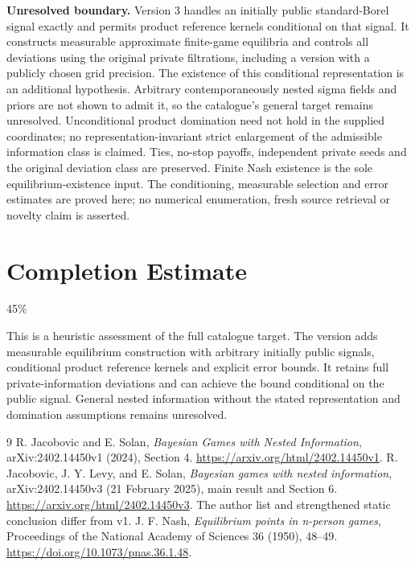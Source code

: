 \documentclass[11pt]{article}
\theoremstyle{remark}\newtheorem{remark}[theorem]{Remark}
\begin{document}
\textbf{Unresolved boundary.} Version 3 handles an initially public
standard-Borel signal exactly and permits product reference kernels
conditional on that signal. It constructs measurable approximate
finite-game equilibria and controls all deviations using the original
private filtrations, including a version with a publicly chosen grid
precision. The existence of this conditional representation is an
additional hypothesis. Arbitrary contemporaneously nested sigma fields
and priors are not shown to admit it, so the catalogue's general target
remains unresolved. Unconditional product domination need not hold in
the supplied coordinates; no representation-invariant strict enlargement
of the admissible information class is claimed. Ties, no-stop payoffs,
independent private seeds and the original deviation class are preserved.
Finite Nash existence is the sole equilibrium-existence input. The
conditioning, measurable selection and error estimates are proved here;
no numerical enumeration, fresh source retrieval or novelty claim is
asserted.

\section{Completion Estimate}
45\%

This is a heuristic assessment of the full catalogue target. The version
adds measurable equilibrium construction with arbitrary initially public
signals, conditional product reference kernels and explicit error bounds.
It retains full private-information deviations and can achieve the bound
conditional on the public signal. General nested information without the
stated representation and domination assumptions remains unresolved.

\begin{thebibliography}{9}
 R. Jacobovic and E. Solan, \emph{Bayesian Games with Nested Information}, arXiv:2402.14450v1 (2024), Section 4. \url{https://arxiv.org/html/2402.14450v1}.
 R. Jacobovic, J. Y. Levy, and E. Solan, \emph{Bayesian games with nested information}, arXiv:2402.14450v3 (21 February 2025), main result and Section 6. \url{https://arxiv.org/html/2402.14450v3}. The author list and strengthened static conclusion differ from v1.
 J. F. Nash, \emph{Equilibrium points in n-person games}, Proceedings of the National Academy of Sciences 36 (1950), 48--49. \url{https://doi.org/10.1073/pnas.36.1.48}.
\end{thebibliography}
\end{document}
